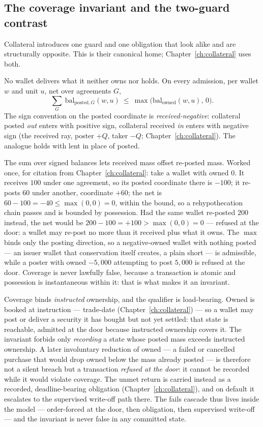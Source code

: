 \subsection{The coverage invariant and the two-guard contrast}

Collateral introduces one guard and one obligation that look alike and are
structurally opposite. This is their canonical home; Chapter~\ref{ch:collateral}
uses both.

\begin{invariant}\label{inv:coverage}
No wallet delivers what it neither owns nor holds. On every admission, per wallet
$w$ and unit $u$, net over agreements $G$,
\[
\sum_{G}\ \mathrm{bal}_{\mathrm{posted},G}(w,u)\ \le\ \max\bigl(\mathrm{bal}_{\mathrm{owned}}(w,u),\,0\bigr).
\]
The sign convention on the posted coordinate is \emph{received-negative}:
collateral posted \emph{out} enters with positive sign, collateral received
\emph{in} enters with negative sign (the received ray, poster $+Q$, taker $-Q$;
Chapter~\ref{ch:collateral}). The analogue holds with lent in place of posted.
\end{invariant}

The sum over signed balances lets received mass offset re-posted mass. Worked once,
for citation from Chapter~\ref{ch:collateral}: take a wallet with owned $0$. It
receives $100$ under one agreement, so its posted coordinate there is $-100$; it
re-posts $60$ under another, coordinate $+60$; the net is $60-100=-40\le\max(0,0)=0$,
within the bound, so a rehypothecation chain passes and is bounded by possession.
Had the same wallet re-posted $200$ instead, the net would be $200-100=+100>\max(0,0)=0$
--- refused at the door: a wallet may re-post no more than it received plus what it
owns. The $\max$ binds only the posting direction, so a negative-owned
wallet with nothing posted --- an issuer wallet that conservation itself creates,
a plain short --- is admissible, while a poster with owned $-5{,}000$ attempting to
post $5{,}000$ is refused at the door. Coverage is never lawfully false, because a
transaction is atomic and possession is instantaneous within it: that is what
makes it an invariant.

Coverage binds \emph{instructed} ownership, and the qualifier is load-bearing. Owned is
booked at instruction --- trade-date (Chapter~\ref{ch:collateral}) --- so a wallet may
post or deliver a security it has bought but not yet settled: that state is reachable,
admitted at the door because instructed ownership covers it. The invariant forbids only
\emph{recording} a state whose posted mass exceeds instructed ownership. A later
involuntary reduction of owned --- a failed or cancelled purchase that would drop owned
below the mass already posted --- is therefore not a silent breach but a transaction
\emph{refused at the door}: it cannot be recorded while it would violate coverage. The
unmet return is carried instead as a recorded, deadline-bearing obligation
(Chapter~\ref{ch:collateral}), and on default it escalates to the supervised write-off
path there. The fails cascade thus lives inside the model --- order-forced at the door,
then obligation, then supervised write-off --- and the invariant is never false in any
committed state.

